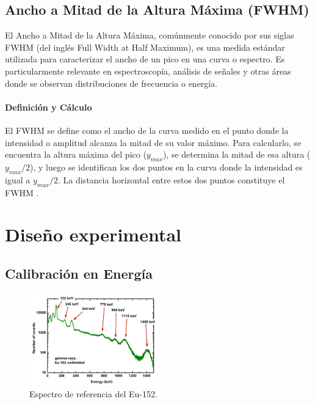 \documentclass[twocolumn,a4paper,11pt]{scrartcl}
\begin{document}
\subsection*{Ancho a Mitad de la Altura Máxima (FWHM)}

El Ancho a Mitad de la Altura Máxima, comúnmente conocido por sus siglas FWHM (del inglés Full Width at Half Maximum), es una medida estándar utilizada para caracterizar el ancho de un pico en una curva o espectro. Es particularmente relevante en espectroscopía, análisis de señales y otras áreas donde se observan distribuciones de frecuencia o energía.

\paragraph{Definición y Cálculo}

El FWHM se define como el ancho de la curva medido en el punto donde la intensidad o amplitud alcanza la mitad de su valor máximo. Para calcularlo, se encuentra la altura máxima del pico ($y_{max}$), se determina la mitad de esa altura ($y_{max}/2$), y luego se identifican los dos puntos en la curva donde la intensidad es igual a $y_{max}/2$. La distancia horizontal entre estos dos puntos constituye el FWHM \cite{WikipediaFWHM}.

\section{Diseño experimental}
\subsection*{Calibración en Energía}

\begin{figure}[]
  \includegraphics[width=0.50\textwidth]{espectro_de_referencia.png}
  \caption{Espectro de referencia del Eu-152.}
  \label{fig:eu152_ref}
\end{figure}
\end{document}
